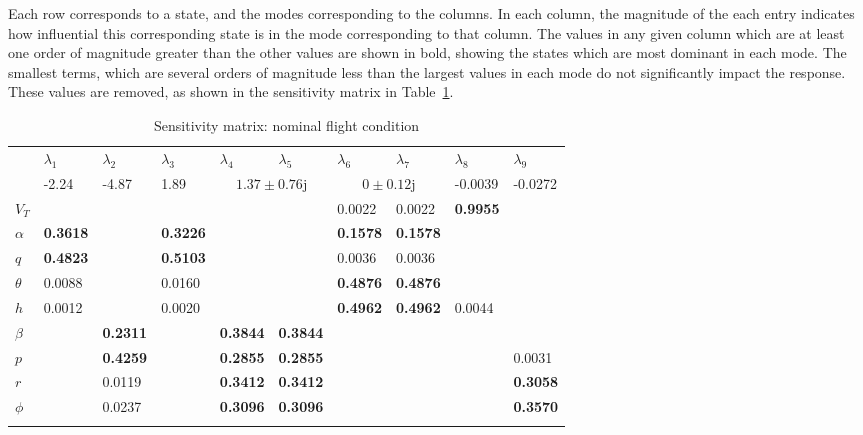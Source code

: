 Each row corresponds to a state, and the modes corresponding to the columns.
In each column, the magnitude of the each entry indicates how influential this corresponding state is in the mode corresponding to that column.
The values in any given column which are at least one order of magnitude greater than the other values are shown in bold, showing the states which are most dominant in each mode.
The smallest terms, which are several orders of magnitude less than the largest values in each mode do not significantly impact the response.
These values are removed, as shown in the sensitivity matrix in Table~\ref{sensmat_fc1_2}.
\begin{table}[H]
  \centering
  \caption{Sensitivity matrix: nominal flight condition}
  \fontsize{8pt}{8pt}\selectfont
  \begin{tabularx}{0.95\textwidth}{|X|XXXXX|XXXX|} %
    \cline{2-10}
    \multicolumn{1}{c|}{} & $\lambda_{1}$     & $\lambda_{2}$     & $\lambda_{3}$     & $\lambda_{4}$     & $\lambda_{5}$    & $\lambda_{6}$     & $\lambda_{7}$     & $\lambda_{8}$     & $\lambda_{9}$ \\
    \multicolumn{1}{c|}{} &  -2.24 & -4.87 & 1.89 & \multicolumn{2}{c|}{$1.37\pm 0.76\mathrm{j}$} & \multicolumn{2}{c}{$0\pm 0.12\mathrm{j}$} & -0.0039 & -0.0272 \\
    \hline %
    $V_{T}$ & \textemdash{} & \textemdash{} & \textemdash{} & \textemdash{} & \textemdash{} & 0.0022 & 0.0022 & \textbf{0.9955} & \textemdash{} \\
    \hline %
    $\alpha$ & \textbf{0.3618} & \textemdash{} & \textbf{0.3226} & \textemdash{} & \textemdash{} & \textbf{0.1578} & \textbf{0.1578} & \textemdash{} & \textemdash{} \\
    $q$     & \textbf{0.4823} & \textemdash{} & \textbf{0.5103} & \textemdash{} & \textemdash{} & 0.0036 & 0.0036 & \textemdash{} & \textemdash{} \\
    $\theta$ & 0.0088 & \textemdash{} & 0.0160 & \textemdash{} & \textemdash{} & \textbf{0.4876} & \textbf{0.4876} & \textemdash{} & \textemdash{} \\
    $h$     & 0.0012 & \textemdash{} & 0.0020 & \textemdash{} & \textemdash{} & \textbf{0.4962} & \textbf{0.4962} & 0.0044 & \textemdash{} \\
    \hline %
    $\beta$ & \textemdash{} & \textbf{0.2311} & \textemdash{} & \textbf{0.3844} & \textbf{0.3844} & \textemdash{} & \textemdash{} & \textemdash{} & \textemdash{} \\
    $p$     & \textemdash{} & \textbf{0.4259} & \textemdash{} & \textbf{0.2855} & \textbf{0.2855} & \textemdash{} & \textemdash{} & \textemdash{} & 0.0031 \\
    $r$     & \textemdash{} & 0.0119 & \textemdash{} & \textbf{0.3412} & \textbf{0.3412} & \textemdash{} & \textemdash{} & \textemdash{} & \textbf{0.3058} \\
    $\phi$ & \textemdash{} & 0.0237 & \textemdash{} & \textbf{0.3096} & \textbf{0.3096} & \textemdash{} & \textemdash{} & \textemdash{} & \textbf{0.3570} \\
    \lasthline%
  \end{tabularx}\label{sensmat_fc1_2}
\end{table}

